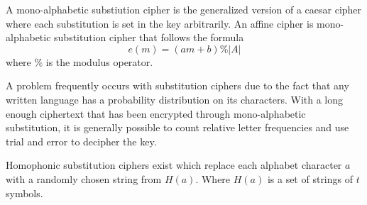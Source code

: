 \documentclass[11pt]{article}
\begin{document}
A mono-alphabetic substiution cipher is the generalized version of a caesar cipher where each substitution is set in the key arbitrarily.
An affine cipher is  mono-alphabetic substitution cipher that follows the formula 
\begin{equation}
    e(m) = (am + b) \% |A|
\end{equation}
where \% is the modulus operator.

A problem frequently occurs with substitution ciphers due to the fact that any written language has a probability distribution on its characters.
With a long enough ciphertext that has been encrypted through mono-alphabetic substitution, it is generally possible to count relative letter frequencies and use trial and error to decipher the key.


Homophonic substitution ciphers exist which replace each alphabet character $a$ with a randomly chosen string from $H(a)$.
Where $H(a)$ is a set of strings of $t$ symbols.
\end{document}

